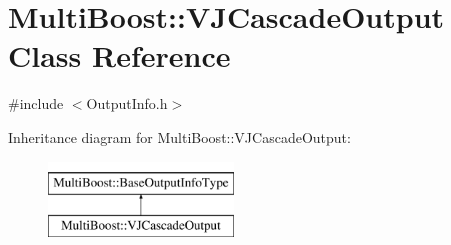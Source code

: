 \hypertarget{classMultiBoost_1_1VJCascadeOutput}{\section{Multi\-Boost\-:\-:V\-J\-Cascade\-Output Class Reference}
\label{classMultiBoost_1_1VJCascadeOutput}
}


{\ttfamily \#include $<$Output\-Info.\-h$>$}

Inheritance diagram for Multi\-Boost\-:\-:V\-J\-Cascade\-Output\-:\begin{figure}[H]
\begin{center}
\leavevmode
\includegraphics[height=2.000000cm]{classMultiBoost_1_1VJCascadeOutput}
\end{center}
\end{figure}
